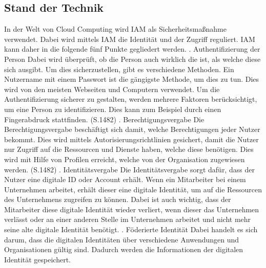 \subsection{Stand der Technik}
\label{sec:chapter04:Stand}
In der Welt von Cloud Computing wird \ac{IAM} als Sicherheitsmaßnahme verwendet.
Dabei wird mittels \ac{IAM} die Identität und der Zugriff reguliert.
\ac{IAM} kann daher in die folgende fünf Punkte gegliedert werden.
\newline
{}. Authentifizierung der Person
\newline
Dabei wird überprüft, ob die Person auch wirklich die ist, als welche diese sich ausgibt.
Um dies sicherzustellen, gibt es verschiedene Methoden.
Ein Nutzername mit einem Passwort ist die gängigste Methode, um dies zu tun. Dies wird von den meisten Webseiten und Computern verwendet.
Um die Authentifizierung sicherer zu gestalten, werden mehrere Faktoren berücksichtigt, um eine Person zu identifizieren.
Dies kann zum Beispiel durch einen Fingerabdruck stattfinden. \cite{IamIEEE} (S.1482)
\newline
{}. Berechtigungsvergabe
\newline
Die Berechtigungsvergabe beschäftigt sich damit, welche Berechtigungen jeder Nutzer bekommt.
Dies wird mittels Autorisierungsrichtlinien gesichert, damit die Nutzer nur Zugriff auf die Ressourcen und Dienste haben, welche diese benötigen.
Dies wird mit Hilfe von Profilen erreicht, welche von der Organisation zugewiesen werden. \cite{IamIEEE} (S.1482)
\newline
{}. Identitätsvergabe
\newline
Die Identitätsvergabe sorgt dafür, dass der Nutzer eine digitale ID oder Account erhält.
Wenn ein Mitarbeiter bei einem Unternehmen arbeitet, erhält dieser eine digitale Identität, um auf die Ressourcen des Unternehmens zugreifen zu können.
Dabei ist auch wichtig, dass der Mitarbeiter diese digitale Identität wieder verliert, wenn dieser das Unternehmen verlässt oder an einer anderen Stelle im Unternehmen arbeitet und nicht mehr seine alte digitale Identität benötigt.
\newline
{}. Föderierte Identität
\newline
Dabei handelt es sich darum, dass die digitalen Identitäten über verschiedene Anwendungen und Organisationen gültig sind.
Dadurch werden die Informationen der digitalen Identität gespeichert.
